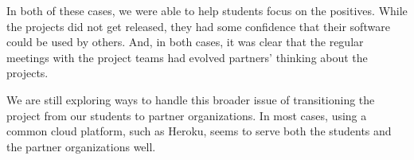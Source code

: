 In both of these cases, we were able to help students focus on the
positives.  While the projects did not get released, they had some
confidence that their software could be used by others.  And, in
both cases, it was clear that the regular meetings with the project
teams had evolved partners' thinking about the projects.

We are still exploring ways to handle this broader issue of
transitioning the project from our students to partner organizations.
In most cases, using a common cloud platform,
such as Heroku, seems to serve both the students
and the partner organizations well.

